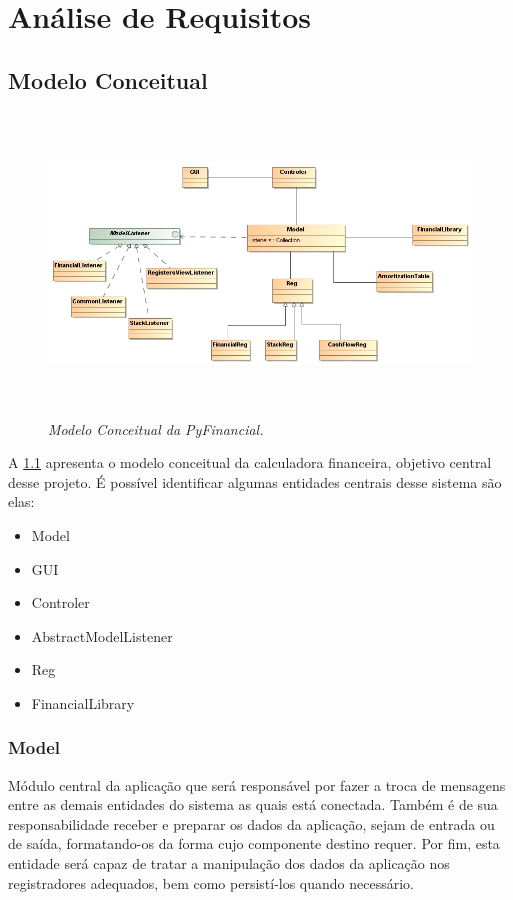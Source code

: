 \chapter{Análise de Requisitos}

\section{Modelo Conceitual}

\begin{figure}[!h]
 \includegraphics[height = 8cm]{CalcDC.jpg}
 \caption{\it Modelo Conceitual da PyFinancial.} \label{fig:modConc}
\end{figure}

A \ref{fig:modConc} apresenta o modelo conceitual da calculadora financeira, objetivo central desse projeto. É possível identificar algumas entidades centrais desse sistema são elas:

\begin{itemize}
	\item Model
	\item GUI
	\item Controler
	\item AbstractModelListener
	\item Reg
	\item FinancialLibrary
\end{itemize}

\subsection{Model}
Módulo central da aplicação que será responsável por fazer a troca de mensagens entre as demais entidades do sistema as quais está conectada. Também é de sua responsabilidade receber e preparar os dados da aplicação, sejam de entrada ou de saída, formatando-os da forma cujo componente destino requer. Por fim, esta entidade será capaz de tratar a manipulação dos dados da aplicação nos registradores adequados, bem como persistí-los quando necessário.
